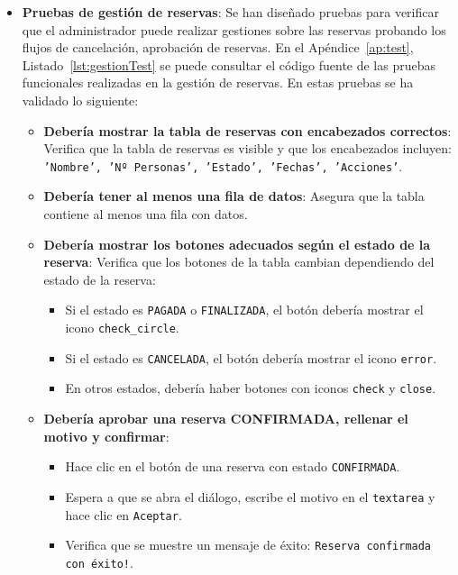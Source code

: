 \begin{itemize}
    \item \textbf{Pruebas de gestión de reservas}: Se han diseñado pruebas para verificar que el administrador puede realizar gestiones sobre las reservas probando los flujos de cancelación, aprobación de reservas. En el Apéndice~\ref{ap:test}, Listado~\ref{lst:gestionTest} se puede consultar el código fuente de las pruebas funcionales realizadas en la gestión de reservas. En estas pruebas se ha validado lo siguiente:
      \begin{itemize}
  \item \textbf{Debería mostrar la tabla de reservas con encabezados correctos}: Verifica que la tabla de reservas es visible y que los encabezados incluyen: \texttt{'Nombre', 'Nº Personas', 'Estado', 'Fechas', 'Acciones'}.
  \item \textbf{Debería tener al menos una fila de datos}: Asegura que la tabla contiene al menos una fila con datos.
  \item \textbf{Debería mostrar los botones adecuados según el estado de la reserva}: Verifica que los botones de la tabla cambian dependiendo del estado de la reserva:
    \begin{itemize}
      \item Si el estado es \texttt{PAGADA} o \texttt{FINALIZADA}, el botón debería mostrar el icono \texttt{check\_circle}.
      \item Si el estado es \texttt{CANCELADA}, el botón debería mostrar el icono \texttt{error}.
      \item En otros estados, debería haber botones con iconos \texttt{check} y \texttt{close}.
    \end{itemize}
  \item \textbf{Debería aprobar una reserva CONFIRMADA, rellenar el motivo y confirmar}: 
    \begin{itemize}
      \item Hace clic en el botón de una reserva con estado \texttt{CONFIRMADA}.
      \item Espera a que se abra el diálogo, escribe el motivo en el \texttt{textarea} y hace clic en \texttt{Aceptar}.
      \item Verifica que se muestre un mensaje de éxito: \texttt{Reserva confirmada con éxito!}.
    \end{itemize}
\end{itemize}


\end{itemize}
